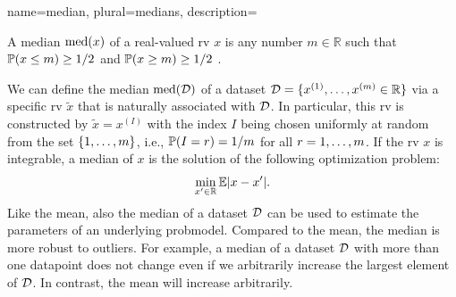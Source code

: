 {name={median}, 
 plural={medians},
 description={A median $\mathrm{med}(x)$ of a real-valued \gls{rv} $x$ 
 is any number $m \in \mathbb{R}$ such that $\mathbb{P}({ x \leq m}) \geq 1/2$ and $\mathbb{P}({ x \geq m}) \geq 1/2$ \cite{LC}. 
 \begin{figure}
	\begin{center}
\end{center}
 \end{figure}  
 We can define the median $\mathrm{med}(\mathcal{D})$ 
 of a \gls{dataset} $\mathcal{D} = \{ x^{(1)}, \ldots, x^{(m)} \in \mathbb{R} \}$ 
 via a specific \gls{rv} $\tilde{x}$ that is naturally associated with $\mathcal{D}$. 
 In particular, this \gls{rv} is constructed by $\tilde{x} = x^{(I)}$ with the index $I$ 
 being chosen uniformly at random from the set $\{1,\ldots,m\}$, i.e., $\mathbb{P}({I = r})=1/m$ for 
 all $r=1,\ldots,m$. If the \gls{rv} $x$ is integrable, a median of $x$ 
 is the solution of the following optimization problem: 
 $$\min_{x' \in \mathbb{R}} \mathbb{E}{|x - x'|}.$$ 
 Like the \gls{mean}, also the median of a \gls{dataset} $\mathcal{D}$ can be used 
 to estimate the \glspl{parameter} of an underlying \gls{probmodel}. Compared 
 to the \gls{mean}, the median is more robust to \glspl{outlier}. For example, 
 a median of a \gls{dataset} $\mathcal{D}$ with more than one \gls{datapoint} does not 
 change even if we arbitrarily increase the largest element of $\mathcal{D}$. In contrast, 
 the \gls{mean} will increase arbitrarily.
	\begin{figure}

\end{figure}}}
